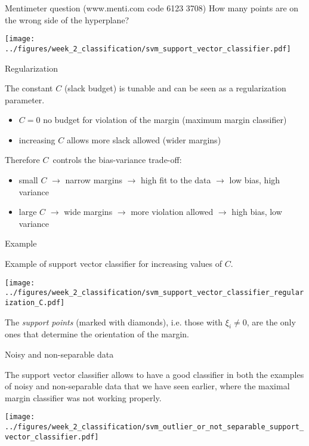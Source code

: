 \documentclass[notes]{beamer}          %
\begin{document}
\begin{frame}{Mentimeter question (www.menti.com code 6123 3708)}
How many points are on the wrong side of the hyperplane?
\begin{center}
\texttt{[image: ../figures/week\_2\_classification/svm\_support\_vector\_classifier.pdf]}  
\end{center}
\end{frame}

\begin{frame}{Regularization}

The constant $C$ (slack budget) is tunable and can be seen as a regularization parameter.

\begin{itemize}
    \item $C = 0$ no budget for violation of the margin (maximum margin classifier)
    \item increasing $C$ allows more slack allowed (wider margins)
\end{itemize}

Therefore $C$\ controls the bias-variance trade-off:

\begin{itemize}
    \item small $C$ $\rightarrow$ narrow margins $\rightarrow$ high fit to the data $\rightarrow$ low bias, high variance
    \item large $C$ $\rightarrow$ wide margins $\rightarrow$ more violation allowed $\rightarrow$ high bias, low variance
\end{itemize}

\end{frame}

\begin{frame}{Example}

Example of support vector classifier for increasing values of $C$.

\begin{center}
\texttt{[image: ../figures/week\_2\_classification/svm\_support\_vector\_classifier\_regularization\_C.pdf]}  
\end{center}

The \textit{support points} (marked with diamonds), i.e. those with $\xi_i \neq 0$, are the only ones that determine the orientation of the margin.

\end{frame}

\begin{frame}{Noisy and non-separable data}

The support vector classifier allows to have a good classifier in both the examples of noisy and non-separable data that we have seen earlier, where the maximal margin classifier was not working properly.

\begin{center}
\texttt{[image: ../figures/week\_2\_classification/svm\_outlier\_or\_not\_separable\_support\_vector\_classifier.pdf]}  
\end{center}

\end{frame}
\end{document}
